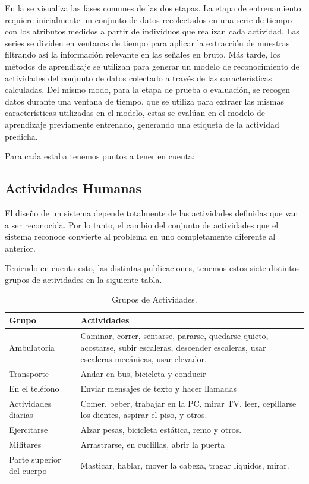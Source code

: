 En la  se visualiza las fases comunes de las
dos etapas. La etapa de entrenamiento requiere inicialmente un conjunto
de datos recolectados en una serie de tiempo con los atributos medidos
a partir de individuos que realizan cada actividad. Las series se
dividen en ventanas de tiempo para aplicar la extracción de muestras
filtrando así la información relevante en las señales en bruto. Más
tarde, los métodos de aprendizaje se utilizan para generar un modelo
de reconocimiento de actividades del conjunto de datos colectado a
través de las características calculadas. Del mismo modo, para la
etapa de prueba o evaluación, se recogen datos durante una ventana
de tiempo, que se utiliza para extraer las mismas características
utilizadas en el modelo, estas se evalúan en el modelo de aprendizaje
previamente entrenado, generando una etiqueta de la actividad predicha.

Para cada estaba tenemos puntos a tener en cuenta:

\subsection{Actividades Humanas}

\label{sec22:actividades-humanas} El diseño de un sistema 
depende totalmente de las actividades definidas que van a ser reconocida.
Por lo tanto, el cambio del conjunto de actividades que el sistema
reconoce convierte al problema en uno completamente diferente al anterior.

Teniendo en cuenta esto, las distintas publicaciones, tenemos estos
siete distintos grupos de actividades en la siguiente tabla.

\begin{table}[htbp]
\centering{}%
\begin{tabular}{|l|p{9cm}|}
\hline 
\textbf{Grupo}  & \textbf{Actividades} \tabularnewline
\hline 
\hline 
Ambulatoria  & Caminar, correr, sentarse, pararse, quedarse quieto, acostarse, subir
escaleras, descender escaleras, usar escaleras mecánicas, usar elevador.\tabularnewline
\hline 
Transporte  & Andar en bus, bicicleta y conducir \tabularnewline
\hline 
En el teléfono  & Enviar mensajes de texto y hacer llamadas \tabularnewline
\hline 
Actividades diarias  & Comer, beber, trabajar en la PC, mirar TV, leer, cepillarse los dientes,
aspirar el piso, y otros. \tabularnewline
\hline 
Ejercitarse  & Alzar pesas, bicicleta estática, remo y otros. \tabularnewline
\hline 
Militares  & Arrastrarse, en cuclillas, abrir la puerta \tabularnewline
\hline 
Parte superior del cuerpo  & Masticar, hablar, mover la cabeza, tragar líquidos, mirar. \tabularnewline
\hline 
\end{tabular}\caption{Grupos de Actividades.}
\label{tabla:sencilla} 
\end{table}


